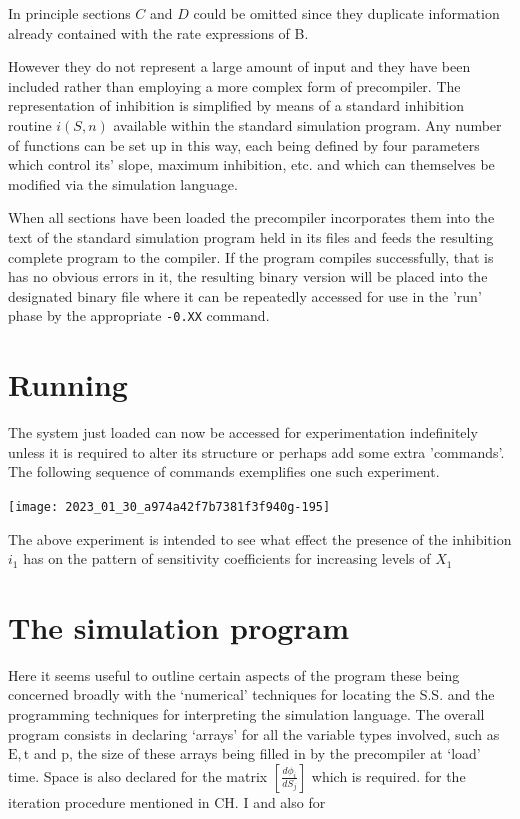 In principle sections $C$ and $D$ could be omitted since they duplicate information already contained with the rate expressions of B.

However they do not represent a large amount of input and they have been included rather than employing a more complex form of precompiler. The representation of inhibition is simplified by means of a standard inhibition routine $i(S, n)$ available within the standard simulation program. Any number of functions can be set up in this way, each being defined by four parameters which control its' slope, maximum inhibition, etc. and which can themselves be modified via the simulation language.

When all sections have been loaded the precompiler incorporates them into the text of the standard simulation program held in its files and feeds the resulting complete program to the compiler. If the program compiles successfully, that is has no obvious errors in it, the resulting binary version will be placed into the designated binary file where it can be repeatedly accessed for use in the 'run' phase by the appropriate {\tt -0.XX} command.

\section{Running}

The system just loaded can now be accessed for experimentation indefinitely unless it is required to alter its structure or perhaps add some extra 'commands'. The following sequence of commands exemplifies one such experiment.

\begin{center}
\texttt{[image: 2023\_01\_30\_a974a42f7b7381f3f940g-195]}
\end{center}

The above experiment is intended to see what effect the presence of the inhibition $i_1$ has on the pattern of sensitivity coefficients for increasing levels of $X_1$

\section{The simulation program}

Here it seems useful to outline certain aspects of the program these being concerned broadly with the `numerical' techniques for locating the S.S. and the programming techniques for interpreting the simulation language. The overall program consists in declaring `arrays' for all the variable types involved, such as $\mathrm{E}, \mathrm{t}$ and $\mathrm{p}$, the size of these arrays being filled in by the precompiler at `load' time. Space is also declared for the matrix $\left[\frac{d \phi_{i}}{d S_{j}}\right]$ which is required. for the iteration procedure mentioned in $\mathrm{CH}$. I and also for

